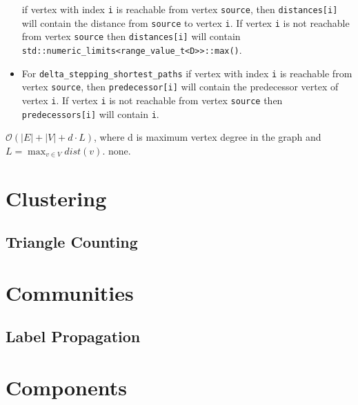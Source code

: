 \begin{itemdescr}
\begin{itemize}
                  if vertex with index \lstinline{i} is reachable from vertex \lstinline{source}, then
                  \lstinline{distances[i]} will contain the distance from \lstinline{source} to vertex
                  \lstinline{i}.  If vertex \lstinline{i} is not reachable from vertex
                  \lstinline{source} then \lstinline{distances[i]} will contain
                  \lstinline{std::numeric_limits<range_value_t<D>>::max()}.
            \item
                  For \lstinline{delta_stepping_shortest_paths} if vertex with index \lstinline{i} is reachable
                  from vertex \lstinline{source}, then \lstinline{predecessor[i]} will contain the
                  predecessor vertex of vertex \lstinline{i}.  If vertex \lstinline{i} is not reachable
                  from vertex \lstinline{source} then \lstinline{predecessors[i]} will contain
                  \lstinline{i}.
      \end{itemize}
      \pnum\complexity $\mathcal{O}(|E| + |V| + d\cdot L)$, where d is maximum vertex degree in the graph and $L = \max_{v\in V} dist(v)$.
      \pnum\throws none. 
\end{itemdescr}



\section{Clustering}
\subsection{Triangle Counting}

\section{Communities}
\subsection{Label Propagation}

\section{Components}
